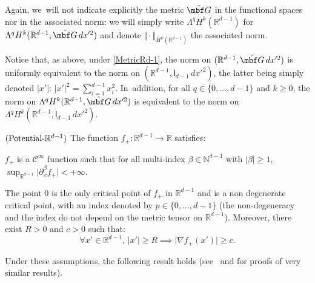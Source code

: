 Again, we~will not indicate explicitly the metric $\tilde {\mbf G}$ in the
functional spaces nor in the associated norm: we will simply write $\Lambda^q H^k(\mathbb
R^{d-1})$ for $\Lambda^qH^k(\mathbb R^{d-1}, \tilde {\mbf G} \, dx'^2)$ and denote $ \Vert \cdot \Vert_{H^k(\mathbb R^{d-1})}$ the
associated norm.

Notice that, as above, under \ref{MetricRd-1}, the norm on $(\mathbb
R^{d-1}, \tilde {\mbf G} \, dx'^2)$ is uniformly equivalent to the
norm on $(\mathbb R^{d-1}, \mathsf I_{d-1} \, dx'^2)$, the latter
being simply denoted $\vert x'\vert$: $\vert x'\vert^2=\sum_{i=1}^{d-1}x_i^2$. In~addition, for all $q\in \{0,\ldots,d-1\}$ and $k\ge 0$, the norm
on $\Lambda^qH^k(\mathbb R^{d-1}, \tilde {\mbf G} \, dx'^2)$ is
equivalent to the norm on $\Lambda^qH^k(\mathbb R^{d-1}, \mathsf I_{d-1} \, dx'^2)$.

\begin{manualassumption}{$(\textup{Potential-}\mathbb R^{d-1})$}\label{PotentialRd-1}
The function $f_+: {\mathbb R^{d-1}}\to \mathbb R$ satisfies:
\begin{enumeratei}
\item\label{PotentialRd-1i}
$f_+$ is a $\mathcal C^\infty$ function such that for all multi-index
$\beta\in \mathbb N^{d-1}$ with $\vert \beta\vert \ge 1$, $\sup_{\mathbb R^{d-1}}\vert \partial_x^\beta f_+\vert<+\infty$.
\item\label{PotentialRd-1ii}
The point $0$ is the only critical point of $f_+$ in ${\mathbb
R^{d-1}}$ and is a non degenerate critical point, with an index
denoted by $p\in
\{0,\ldots,d-1\}$ (the non-degeneracy and the index do not depend on the metric tensor
on $\mathbb R^{d-1}$). Moreover, there exist $R>0$ and $c>0$ such that:
\[
\forall x'\in \mathbb R^{d-1}, \, \vert x'\vert \ge R \implies \vert \nabla f_+(x')\vert \ge c.
\]
\end{enumeratei}
\end{manualassumption}

Under these assumptions, the following result holds (see~\cite[Prop.\,3.3.2 \&~3.3.3]{helffer-nier-06} and\cite[Prop.\,2.2]{HKN} for proofs of very similar results).

